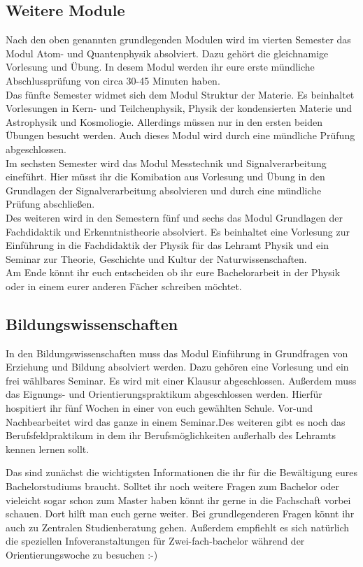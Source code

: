 \begin{multicols*}{2}
\subsection*{Weitere Module}
Nach den oben genannten grundlegenden Modulen wird im vierten Semester das Modul Atom- und Quantenphysik absolviert. Dazu gehört die gleichnamige Vorlesung und Übung. In desem Modul werden ihr eure erste mündliche Abschlussprüfung von circa 30-45 Minuten haben.\\ Das fünfte Semester widmet sich dem Modul Struktur der Materie. Es beinhaltet Vorlesungen in Kern- und Teilchenphysik, Physik der kondensierten Materie und Astrophysik und Kosmoliogie. Allerdings müssen nur in den ersten beiden Übungen besucht werden. Auch dieses Modul wird durch eine mündliche Prüfung abgeschlossen.\\ Im sechsten Semester wird das Modul Messtechnik und Signalverarbeitung eineführt. Hier müsst ihr die Komibation aus Vorlesung und Übung in den Grundlagen der Signalverarbeitung absolvieren und durch eine mündliche Prüfung abschließen.\\ Des weiteren wird in den Semestern fünf und sechs das Modul Grundlagen der Fachdidaktik und Erkenntnistheorie absolviert. Es beinhaltet eine Vorlesung zur Einführung in die Fachdidaktik der Physik für das Lehramt Physik und ein Seminar zur Theorie, Geschichte und Kultur der Naturwissenschaften.\\ Am Ende könnt ihr euch entscheiden ob ihr eure Bachelorarbeit in der Physik oder in einem eurer anderen Fächer schreiben möchtet.
\subsection*{Bildungswissenschaften}
In den Bildungswissenschaften muss das Modul Einführung in Grundfragen von Erziehung und Bildung absolviert werden. Dazu gehören eine Vorlesung und ein frei wählbares Seminar. Es wird mit einer Klausur abgeschlossen. Außerdem muss das Eignungs- und Orientierungspraktikum abgeschlossen werden. Hierfür hospitiert ihr fünf Wochen in einer von euch gewählten Schule. Vor-und Nachbearbeitet wird das ganze in einem Seminar.Des weiteren gibt es noch das Berufsfeldpraktikum in dem ihr Berufsmöglichkeiten außerhalb des Lehramts kennen lernen sollt.

Das sind zunächst die wichtigsten Informationen die ihr für die Bewältigung eures Bachelorstudiums braucht. Solltet ihr noch weitere Fragen zum Bachelor oder vieleicht sogar schon zum Master haben könnt ihr gerne in die Fachschaft vorbei schauen. Dort hilft man euch gerne weiter. Bei grundlegenderen Fragen könnt ihr auch zu Zentralen Studienberatung gehen. Außerdem empfiehlt es sich natürlich die speziellen Infoveranstaltungen für Zwei-fach-bachelor während der Orientierungswoche zu besuchen :-)


\end{multicols*}
